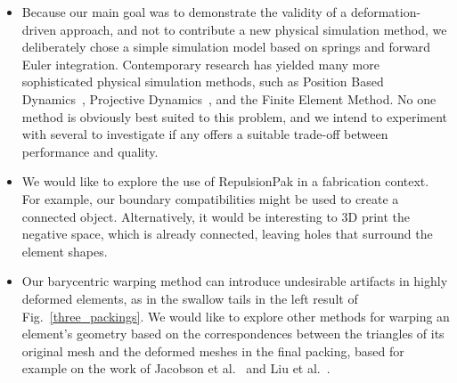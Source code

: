 \begin{itemize}
\item 
	Because our main goal was to demonstrate the validity of a 
	deformation-driven approach, and not to contribute a new
	physical simulation method, we deliberately chose a simple 
	simulation model based on springs and forward Euler integration.
	Contemporary research has yielded many more sophisticated 
	physical simulation methods, such as Position Based Dynamics~\cite{Muller2007}, 
	Projective Dynamics~\cite{Bouaziz2014}, and the Finite Element Method.
	No one method is obviously best suited to this problem, and
	we intend to experiment with several to investigate if any offers
	a suitable trade-off between performance and quality.

\item We would like to explore the use of RepulsionPak in a fabrication context.
      For example, our boundary compatibilities might be used to create a connected object.
      Alternatively, it would be interesting to 3D print the 
      negative space, which is already connected,
	  leaving holes that surround the element shapes.

\item Our barycentric warping method can
	introduce undesirable artifacts in highly deformed elements, as
	in the swallow tails in the left result of Fig.~\ref{three_packings}.
	We would like to explore other methods for warping an element's
	geometry based on the correspondences between the triangles of its original
	mesh and the deformed meshes in the final packing, based for example on the
	work of Jacobson et al.~\cite{Jacobson2011} and Liu et al.~\cite{Liu2014}.

\end{itemize}